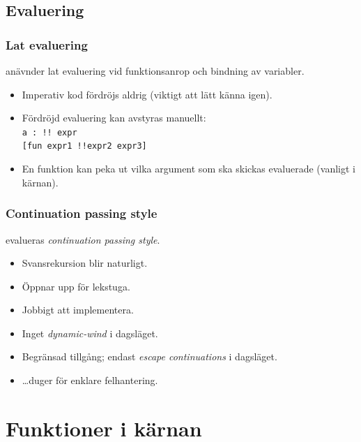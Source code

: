 \documentclass[noamsthm,handout]{beamer}
\begin{document}
\subsection{Evaluering}
\begin{frame}\frametitle{Lat evaluering}
  \Shapes anävnder lat evaluering vid funktionsanrop och bindning av variabler.

  \begin{itemize}
  \item Imperativ kod fördröjs aldrig (viktigt att lätt känna igen).
  \item Fördröjd evaluering kan avstyras manuellt:\\
    \texttt{a : {\color{red}!!} expr}\\
    \texttt{[fun expr1 {\color{red}!!}expr2 expr3]}
  \item En funktion kan peka ut vilka argument som ska skickas evaluerade (vanligt i kärnan).
  \end{itemize}

\end{frame}
\begin{frame}\frametitle{Continuation passing style}
  \Shapes evalueras \emph{continuation passing style}.
  \begin{itemize}
  \item Svansrekursion blir naturligt.
  \item Öppnar upp för lekstuga.
  \item Jobbigt att implementera.
  \item Inget \emph{dynamic-wind} i dagsläget.
  \item Begränsad tillgång; endast \emph{escape continuations} i dagsläget.
  \item \ldots duger för enklare felhantering.
  \end{itemize}
\end{frame}


\section{Funktioner i kärnan}
\end{document}

